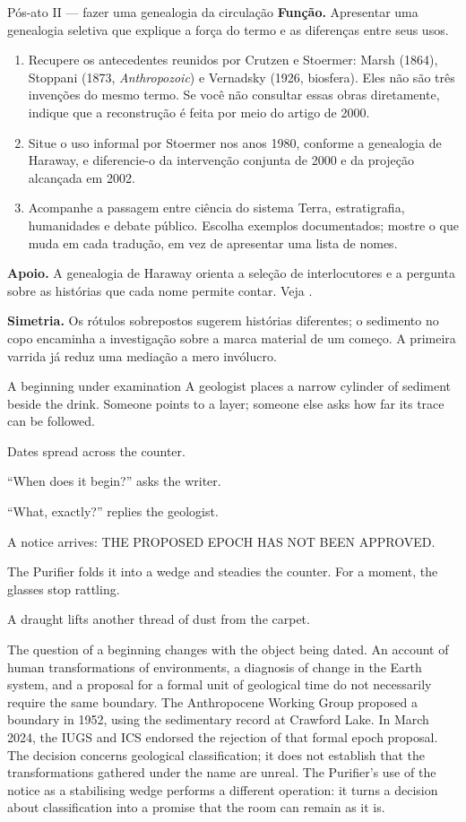 \begin{orientacao}{Pós-ato II --- fazer uma genealogia da circulação}
\textbf{Função.} Apresentar uma genealogia seletiva que explique a força
do termo e as diferenças entre seus usos.
\begin{enumerate}
\item Recupere os antecedentes reunidos por Crutzen e Stoermer:
Marsh (1864), Stoppani (1873, \textit{Anthropozoic}) e Vernadsky
(1926, biosfera). Eles não são três invenções do mesmo termo. Se você
não consultar essas obras diretamente, indique que a reconstrução é
feita por meio do artigo de 2000.
\item Situe o uso informal por Stoermer nos anos 1980, conforme a
genealogia de Haraway, e diferencie-o da intervenção conjunta de 2000
e da projeção alcançada em 2002.
\item Acompanhe a passagem entre ciência do sistema Terra, estratigrafia,
humanidades e debate público. Escolha exemplos documentados; mostre
o que muda em cada tradução, em vez de apresentar uma lista de nomes.
\end{enumerate}
\textbf{Apoio.} A genealogia de Haraway orienta a seleção de interlocutores
e a pergunta sobre as histórias que cada nome permite contar.
Veja .

\textbf{Simetria.} Os rótulos sobrepostos sugerem histórias diferentes;
o sedimento no copo encaminha a investigação sobre a marca material de
um começo. A primeira varrida já reduz uma mediação a mero invólucro.
\end{orientacao}

\begin{ato}{A beginning under examination}
A geologist places a narrow cylinder of sediment beside the drink.
Someone points to a layer; someone else asks how far its trace can be
followed.

Dates spread across the counter.

“When does it begin?” asks the writer.

“What, exactly?” replies the geologist.

A notice arrives: THE PROPOSED EPOCH HAS NOT BEEN APPROVED.

The Purifier folds it into a wedge and steadies the counter. For a moment,
the glasses stop rattling.

A draught lifts another thread of dust from the carpet.
\end{ato}

The question of a beginning changes with the object being dated. An
account of human transformations of environments, a diagnosis of change
in the Earth system, and a proposal for a formal unit of geological time
do not necessarily require the same boundary. The Anthropocene Working
Group proposed a boundary in 1952, using the sedimentary record at
Crawford Lake.
In March 2024, the IUGS and ICS endorsed the rejection of that formal
epoch proposal.
The decision concerns geological classification; it does not establish
that the transformations gathered under the name are unreal. The
Purifier's use of the notice as a stabilising wedge performs a different
operation: it turns a decision about classification into a promise that
the room can remain as it is.

